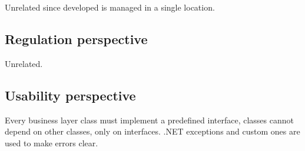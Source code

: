 Unrelated since developed is managed in a single location.

\subsection{Regulation perspective}

Unrelated.

\subsection{Usability perspective}

Every business layer class must implement a predefined interface, classes cannot depend on other classes, only on interfaces. .NET exceptions and custom ones are used to make errors clear. 
